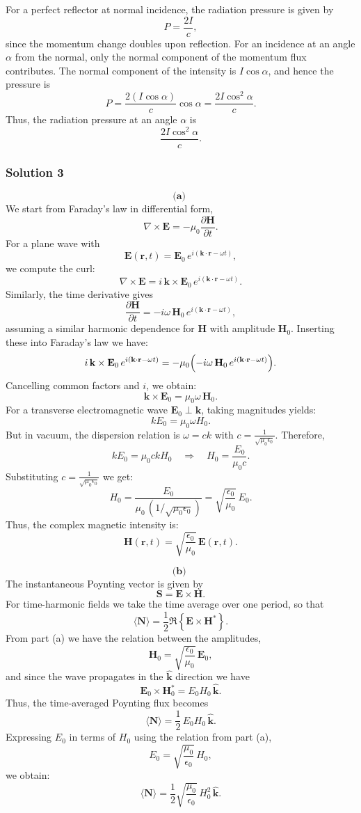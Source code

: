 \documentclass{article}
\begin{document}
For a perfect reflector at normal incidence, the radiation pressure is given by
\[
P = \frac{2I}{c},
\]
since the momentum change doubles upon reflection. For an incidence at an angle \(\alpha\) from the normal, only the normal component of the momentum flux contributes. The normal component of the intensity is \(I\cos\alpha\), and hence the pressure is
\[
P = \frac{2(I\cos\alpha)}{c}\cos\alpha = \frac{2I\cos^2\alpha}{c}.
\]
Thus, the radiation pressure at an angle \(\alpha\) is
\[
\frac{2I\cos^2\alpha}{c}.
\]

\subsubsection{Solution 3}
\[
\textbf{(a) }
\]
We start from Faraday’s law in differential form,
\[
\nabla \times \mathbf{E} = -\mu_0 \frac{\partial \mathbf{H}}{\partial t}.
\]
For a plane wave with 
\[
\mathbf{E}(\mathbf{r},t)=\mathbf{E}_0\, e^{i(\mathbf{k}\cdot\mathbf{r}-\omega t)},
\]
we compute the curl:
\[
\nabla \times \mathbf{E} = i\,\mathbf{k}\times \mathbf{E}_0\, e^{i(\mathbf{k}\cdot\mathbf{r}-\omega t)}.
\]
Similarly, the time derivative gives
\[
\frac{\partial \mathbf{H}}{\partial t} = -i\omega\, \mathbf{H}_0\, e^{i(\mathbf{k}\cdot\mathbf{r}-\omega t)},
\]
assuming a similar harmonic dependence for \(\mathbf{H}\) with amplitude \(\mathbf{H}_0\). Inserting these into Faraday’s law we have:
\[
i\,\mathbf{k}\times \mathbf{E}_0\, e^{i(\mathbf{k}\cdot\mathbf{r}-\omega t)} = -\mu_0 \Bigl(-i\omega\, \mathbf{H}_0\, e^{i(\mathbf{k}\cdot\mathbf{r}-\omega t)}\Bigr).
\]
Cancelling common factors and \(i\), we obtain:
\[
\mathbf{k}\times \mathbf{E}_0 = \mu_0 \omega\, \mathbf{H}_0.
\]
For a transverse electromagnetic wave \(\mathbf{E}_0 \perp \mathbf{k}\), taking magnitudes yields:
\[
kE_0 = \mu_0 \omega H_0.
\]
But in vacuum, the dispersion relation is \( \omega = ck\) with \( c=\frac{1}{\sqrt{\mu_0\epsilon_0}}\). Therefore,
\[
kE_0 = \mu_0 c k H_0 \quad \Longrightarrow \quad H_0 = \frac{E_0}{\mu_0 c}.
\]
Substituting \( c=\frac{1}{\sqrt{\mu_0\epsilon_0}} \) we get:
\[
H_0 = \frac{E_0}{\mu_0\,(1/\sqrt{\mu_0\epsilon_0})} = \sqrt{\frac{\epsilon_0}{\mu_0}}\, E_0.
\]
Thus, the complex magnetic intensity is:
\[
\mathbf{H}(\mathbf{r},t)= \sqrt{\frac{\epsilon_0}{\mu_0}}\, \mathbf{E}(\mathbf{r},t).
\]

\[
\textbf{(b) }
\]
The instantaneous Poynting vector is given by
\[
\mathbf{S} = \mathbf{E} \times \mathbf{H}.
\]
For time-harmonic fields we take the time average over one period, so that
\[
\langle \mathbf{N} \rangle = \frac{1}{2} \Re\left\{\mathbf{E} \times \mathbf{H}^*\right\}.
\]
From part (a) we have the relation between the amplitudes,
\[
\mathbf{H}_0 = \sqrt{\frac{\epsilon_0}{\mu_0}}\, \mathbf{E}_0,
\]
and since the wave propagates in the \(\hat{\mathbf{k}}\) direction we have
\[
\mathbf{E}_0 \times \mathbf{H}_0^* = E_0 H_0\, \hat{\mathbf{k}}.
\]
Thus, the time-averaged Poynting flux becomes
\[
\langle \mathbf{N} \rangle = \frac{1}{2}\,E_0H_0\,\hat{\mathbf{k}}.
\]
Expressing \(E_0\) in terms of \(H_0\) using the relation from part (a),
\[
E_0 = \sqrt{\frac{\mu_0}{\epsilon_0}}\,H_0,
\]
we obtain:
\[
\langle \mathbf{N} \rangle = \frac{1}{2} \sqrt{\frac{\mu_0}{\epsilon_0}}\,H_0^2\,\hat{\mathbf{k}}.
\]
\end{document}
